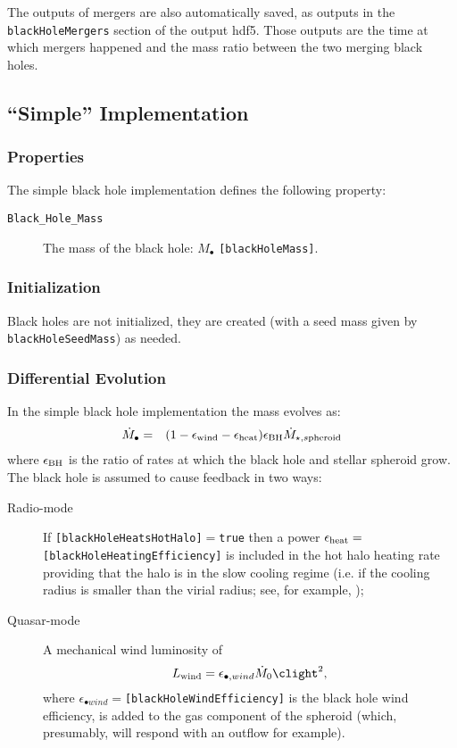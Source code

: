 The outputs of mergers are also automatically saved, as outputs in the {\tt blackHoleMergers} section of the output hdf5. Those outputs are the time at which mergers happened and the mass ratio between  the two merging black holes.


\subsection{``Simple'' Implementation}

\subsubsection{Properties}

The simple black hole implementation defines the following property:
\begin{description}
 \item [{\tt Black\_Hole\_Mass}] The mass of the black hole: $M_\bullet$ {\tt [blackHoleMass]}.
\end{description}

\subsubsection{Initialization}

Black holes are not initialized, they are created (with a seed mass given by {\tt blackHoleSeedMass}) as needed.

\subsubsection{Differential Evolution}

In the simple black hole implementation the mass evolves as:
\begin{eqnarray}
\dot{M}_\bullet &=& (1-\epsilon_{\rm wind}-\epsilon_{\rm heat}) \epsilon_{\rm BH} \dot{M}_{\star,s{\rm pheroid}} \\
\end{eqnarray}
where $\epsilon_{\rm BH}$ is the ratio of rates at which the black hole and stellar spheroid grow. The black hole is assumed to cause feedback in two ways:
\begin{description}
 \item [Radio-mode] If {\tt [blackHoleHeatsHotHalo]}$=${\tt true} then a power $\epsilon_{\rm heat}=${\tt [blackHoleHeatingEfficiency]} is included in the hot halo heating rate providing that the halo is in the slow cooling regime (i.e. if the cooling radius is smaller than the virial radius; see, for example, \citealt{benson_cold_2010});
 \item [Quasar-mode] A mechanical wind luminosity of \citep{ostriker_momentum_2010}
\begin{equation}
 L_{\rm wind} = \epsilon_{\bullet, wind} \dot{M}_0 \clight^2,
\end{equation}
where $\epsilon_{\bullet wind}=${\tt [blackHoleWindEfficiency]} is the black hole wind efficiency, is added to the gas \gls{component} of the spheroid (which, presumably, will respond with an outflow for example).
\end{description}


